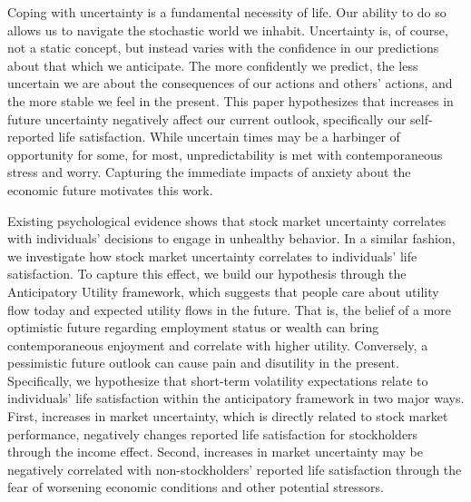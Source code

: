 \documentclass[11pt,a4paper,oldfontcommands]{memoir}
\begin{document}
{Coping with uncertainty is a fundamental necessity of life. Our ability to do so allows us to navigate the stochastic world we inhabit. Uncertainty is, of course, not a static concept, but instead varies with the confidence in our predictions about that which we anticipate. The more confidently we predict, the less uncertain we are about the consequences of our actions and others' actions, and the more stable we feel in the present. This paper hypothesizes that increases in future uncertainty negatively affect our current outlook, specifically our self-reported life satisfaction. While uncertain times may be a harbinger of opportunity for some, for most, unpredictability is met with contemporaneous stress and worry. Capturing the immediate impacts of anxiety about the economic future motivates this work.  

Existing psychological evidence shows that stock market uncertainty correlates with individuals' decisions to engage in unhealthy behavior. In a similar fashion, we investigate how stock market uncertainty correlates to individuals' life satisfaction. To capture this effect, we build our hypothesis through the Anticipatory Utility framework, which suggests that people care about utility flow today and expected utility flows in the future. That is, the belief of a more optimistic future regarding employment status or wealth can bring contemporaneous enjoyment and correlate with higher utility. Conversely, a pessimistic future outlook can cause pain and disutility in the present. Specifically, we hypothesize that short-term volatility expectations relate to individuals' life satisfaction within the anticipatory framework in two major ways. First, increases in market uncertainty, which is directly related to stock market performance, negatively changes reported life satisfaction for stockholders through the income effect. Second, increases in market uncertainty may be negatively correlated with non-stockholders' reported life satisfaction through the fear of worsening economic conditions and other potential stressors.

}
\end{document}
